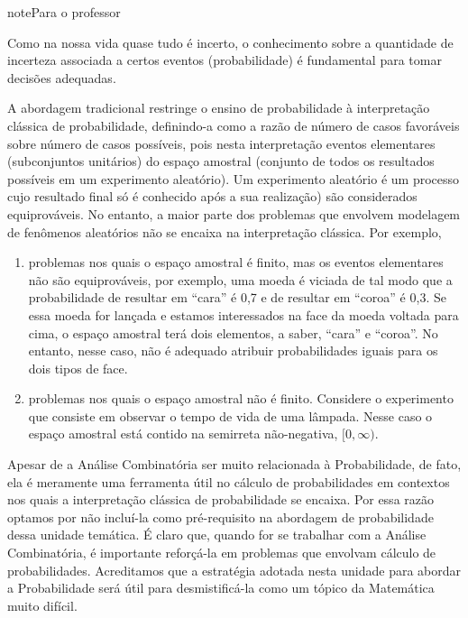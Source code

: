 \begin{sphinxadmonition}{note}{Para o professor}


Como na nossa vida quase tudo é incerto, o conhecimento sobre a quantidade de incerteza associada a certos eventos (probabilidade) é fundamental para tomar decisões adequadas.

A abordagem tradicional restringe o ensino de probabilidade à interpretação clássica de probabilidade, definindo-a como a razão de número de casos favoráveis sobre número de casos possíveis, pois nesta interpretação eventos elementares (subconjuntos unitários) do espaço amostral (conjunto de todos os resultados possíveis em um experimento aleatório). Um experimento aleatório é um processo cujo resultado final só é conhecido após a sua realização) são considerados equiprováveis. No entanto, a maior parte dos problemas que envolvem modelagem de fenômenos aleatórios não se encaixa na interpretação clássica. Por exemplo,
\begin{enumerate}
\item {} 
problemas nos quais o espaço amostral é finito, mas os eventos elementares não são equiprováveis, por exemplo, uma moeda é viciada de tal modo que a probabilidade de resultar em “cara” é 0,7 e de resultar em “coroa” é 0,3. Se essa moeda for lançada e estamos interessados na face da moeda voltada para cima, o espaço amostral terá dois elementos, a saber, “cara” e “coroa”. No entanto, nesse caso, não é adequado atribuir probabilidades iguais para os dois tipos de face.

\item {} 
problemas nos quais o espaço amostral não é finito. Considere o experimento que consiste em observar o tempo de vida de uma lâmpada. Nesse caso o espaço amostral está contido na semirreta não-negativa, \([0,\infty)\).

\end{enumerate}

Apesar de a Análise Combinatória ser muito relacionada à Probabilidade, de fato, ela é meramente uma ferramenta útil no cálculo de probabilidades em contextos nos quais a interpretação clássica de probabilidade se encaixa.  Por essa razão optamos por não incluí-la como pré-requisito na abordagem de probabilidade dessa unidade temática. É claro que, quando for se trabalhar com a Análise Combinatória, é importante reforçá-la em problemas que envolvam cálculo de probabilidades. Acreditamos que a estratégia adotada nesta unidade para abordar a Probabilidade será útil para desmistificá-la como um tópico da Matemática muito difícil.


\end{sphinxadmonition}
